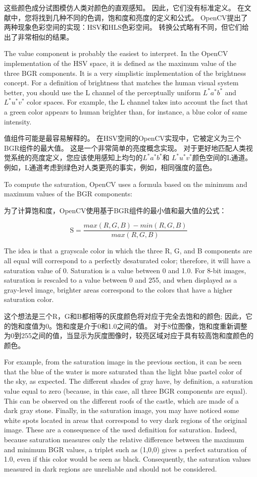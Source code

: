 \documentclass[]{article}
\begin{document}
这些颜色成分试图模仿人类对颜色的直观感知。 因此，它们没有标准定义。
在文献中，您将找到几种不同的色调，饱和度和亮度的定义和公式。
OpenCV提出了两种现象色彩空间的实现：HSV和HLS色彩空间。
转换公式略有不同，但它们给出了非常相似的结果。

The value component is probably the easiest to interpret. In the OpenCV
implementation of the HSV space, it is defined as the maximum value of
the three BGR components. It is a very simplistic implementation of the
brightness concept. For a definition of brightness that matches the
human visual system better, you should use the L channel of the
perceptually uniform \(L^{*}a^{*}b^{*}\) and \(L^{*}u^{*}v^{*}\) color
spaces. For example, the L channel takes into account the fact that a
green color appears to human brighter than, for instance, a blue color
of same intensity.

值组件可能是最容易解释的。
在HSV空间的OpenCV实现中，它被定义为三个BGR组件的最大值。
这是一个非常简单的亮度概念实现。
对于更好地匹配人类视觉系统的亮度定义，您应该使用感知上均匀的\(L^{*}a^{*}b^{*}\)和
\(L^{*}u^{*}v^{*}\)颜色空间的L通道。
例如，L通道考虑到绿色对人类更亮的事实，例如，相同强度的蓝色。

To compute the saturation, OpenCV uses a formula based on the minimum
and maximum values of the BGR components:

为了计算饱和度，OpenCV使用基于BGR组件的最小值和最大值的公式：

\[\text{S} = \frac{max(R,G,B) - min(R,G,B)}{max(R,G,B)}\]

The idea is that a grayscale color in which the three R, G, and B
components are all equal will correspond to a perfectly desaturated
color; therefore, it will have a saturation value of 0. Saturation is a
value between 0 and 1.0. For 8-bit images, saturation is rescaled to a
value between 0 and 255, and when displayed as a gray-level image,
brighter areas correspond to the colors that have a higher saturation
color.

这个想法是三个R，G和B都相等的灰度颜色将对应于完全去饱和的颜色;
因此，它的饱和度值为0。饱和度是介于0和1.0之间的值。
对于8位图像，饱和度重新调整为0到255之间的值，当显示为灰度图像时，较亮区域对应于具有较高饱和度颜色的颜色。

For example, from the saturation image in the previous section, it can
be seen that the blue of the water is more saturated than the light blue
pastel color of the sky, as expected. The different shades of gray have,
by definition, a saturation value equal to zero (because, in this case,
all three BGR components are equal). This can be observed on the
different roofs of the castle, which are made of a dark gray stone.
Finally, in the saturation image, you may have noticed some white spots
located in areas that correspond to very dark regions of the original
image. These are a consequence of the used definition for saturation.
Indeed, because saturation measures only the relative difference between
the maximum and minimum BGR values, a triplet such as (1,0,0) gives a
perfect saturation of 1.0, even if this color would be seen as black.
Consequently, the saturation values measured in dark regions are
unreliable and should not be considered.
\end{document}
